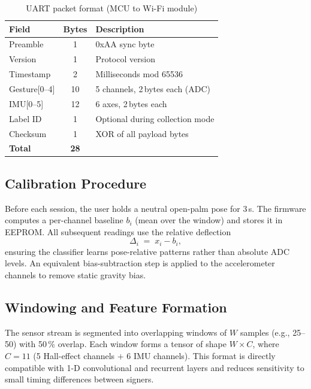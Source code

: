 \documentclass[conference]{IEEEtran}
\begin{document}
\begin{table}[!t]
  \centering\caption{UART packet format (MCU to Wi-Fi module)}\label{tab:packet}
  \begin{tabularx}{\columnwidth}{@{}lcX@{}}
    \toprule Field & Bytes & Description \\\midrule
    Preamble       & 1  & 0xAA sync byte \\
    Version        & 1  & Protocol version \\
    Timestamp      & 2  & Milliseconds mod 65536 \\
    Gesture[0--4]  & 10 & 5 channels, 2\,bytes each (ADC) \\
    IMU[0--5]      & 12 & 6 axes, 2\,bytes each \\
    Label ID       & 1  & Optional during collection mode \\
    Checksum       & 1  & XOR of all payload bytes \\
    \midrule
    \textbf{Total} & \textbf{28} & \\
    \bottomrule
  \end{tabularx}
\end{table}

\subsection{Calibration Procedure}
\label{sec:calib}

Before each session, the user holds a neutral open-palm pose for 3\,s. The
firmware computes a per-channel baseline $b_i$ (mean over the window) and
stores it in EEPROM. All subsequent readings use the relative deflection
\begin{equation}
  \Delta_i \;=\; x_i - b_i ,
  \label{eq:calib}
\end{equation}
ensuring the classifier learns pose-relative patterns rather than absolute
ADC levels. An equivalent bias-subtraction step is applied to the accelerometer
channels to remove static gravity bias.

\subsection{Windowing and Feature Formation}

The sensor stream is segmented into overlapping windows of $W$ samples
(e.g., 25--50) with 50\,\% overlap. Each window forms a tensor of shape
$W \times C$, where $C = 11$ (5 Hall-effect channels $+$ 6 IMU channels).
This format is directly compatible with 1-D convolutional and recurrent layers
and reduces sensitivity to small timing differences between signers.
\end{document}
